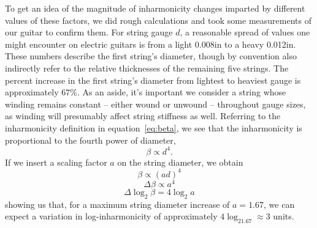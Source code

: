 \documentclass[12pt]{cmuthesis}
\begin{document}
To get an idea of the magnitude of inharmonicity changes imparted by different values of these factors, we did rough calculations and took some measurements of our guitar to confirm them. For string gauge $d$, a reasonable spread of values one might encounter on electric guitars is from a light 0.008in to a heavy 0.012in. These numbers describe the first string's diameter, though by convention also indirectly refer to the relative thicknesses of the remaining five strings. The percent increase in the first string's diameter from lightest to heaviest gauge is approximately $67\%$. As an aside, it's important we consider a string whose winding remains constant -- either wound or unwound -- throughout gauge sizes, as winding will presumably affect string stiffness as well. Referring to the inharmonicity definition in equation~\eqref{eq:beta}, we see that the inharmonicity is proportional to the fourth power of diameter,
\begin{equation}
\beta \propto d^4.
\end{equation}
If we insert a scaling factor $a$ on the string diameter, we obtain
\begin{equation}
\beta \propto(ad)^4
\end{equation}
\begin{equation}
\Delta\beta \propto a^4
\end{equation}
\begin{equation}
\Delta\log_2\beta = 4\log_2a
\end{equation}
showing us that, for a maximum string diameter increase of $a=1.67$, we can expect a variation in log-inharmonicity of approximately $4\log_21.67 \approx 3$ units.
\end{document}
